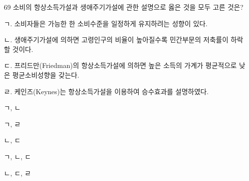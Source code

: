 \begin{question}{69}
소비의 항상소득가설과 생애주기가설에 관한 설명으로 옳은 것을 모두 고른 것은?
\begin{framedtext}
ㄱ. 소비자들은 가능한 한 소비수준을 일정하게 유지하려는 성향이 있다. \par
ㄴ. 생애주기가설에 의하면 고령인구의 비율이 높아질수록 민간부문의 저축률이 하락할 것이다. \par
ㄷ. 프리드만(Friedman)의 항상소득가설에 의하면 높은 소득의 가계가 평균적으로 낮은 평균소비성향을 갖는다. \par
ㄹ. 케인즈(Keynes)는 항상소득가설을 이용하여 승수효과를 설명하였다. \par
\end{framedtext}
\begin{choices}
  \item ㄱ, ㄴ
  \item ㄱ, ㄹ
  \item ㄴ, ㄷ
  \item ㄱ, ㄴ, ㄷ
  \item ㄴ, ㄷ, ㄹ
\end{choices}
\end{question}
